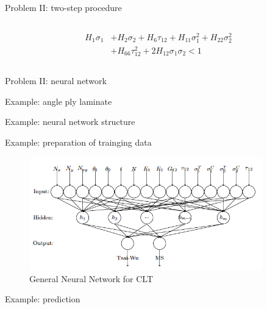 \documentclass{beamer}
\begin{document}
\begin{frame}{Problem II: two-step procedure}
\begin{columns}[c]
\begin{column}{0.6\textwidth}
\begin{itemize}
		 \begingroup
		 \small
		 \begin{equation*} 
		 \begin{split}
			H_1 \sigma_1  & + H_2 \sigma_2 + H_6 \tau_{12} + H_{11}\sigma_1^2 + H_{22} \sigma_2^2 \\
						  & + H_{66}  \tau_{12}^2 + 2H_{12}\sigma_1\sigma_2 < 1
		 \end{split}
		\end{equation*}
		\endgroup
		\end{itemize}
    \end{column}
\end{columns}
\end{frame}

\begin{frame}{Problem II: neural network}
	
\end{frame}

\begin{frame}{Example: angle ply laminate}
	
\end{frame}

\begin{frame}{Example: neural network structure}
	
\end{frame}

\begin{frame}{Example: preparation of trainging data}
	\begin{figure}
		\includegraphics[width=0.9\textwidth]{fig/a0_figure_ann_for_clt_architecture.png}
		\caption{General Neural Network for CLT}
	\end{figure}
\end{frame}

\begin{frame}{Example: prediction}
	
\end{frame}
\end{document}
